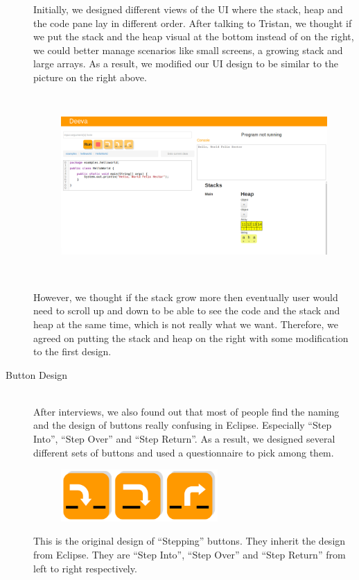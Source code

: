 \documentclass[11pt, a4paper]{article}
\begin{document}
\begin{description}
Initially, we designed different views of the UI where the stack, heap and the code pane lay in different order.
After talking to Tristan, we thought if we put the stack and the heap visual at the bottom instead of on the right, we could better manage scenarios like small screens, a growing stack and large arrays.
As a result, we modified our UI design to be similar to the picture on the right above.\\
\begin{figure}[h!]
\centering
\includegraphics[height=70mm,width=130mm]{finalDesign.png}
\end{figure}

However, we thought if the stack grow more then eventually user would need to scroll up and down to be able to see the code and the stack and heap at the same time, which is not really what we want.
Therefore, we agreed on putting the stack and heap on the right with some modification to the first design.

\item[Button Design] \hfill \\
After interviews, we also found out that most of people find the naming and the design of buttons really confusing in Eclipse.
Especially “Step Into”, “Step Over” and “Step Return”. As a result, we designed several different sets of buttons and used a questionnaire to pick among them.
\begin{figure}[h!]
\centering
\includegraphics[height=20mm,width=60mm]{buttons1.png}
\end{figure}

This is the original design of “Stepping” buttons.
They inherit the design from Eclipse.
They are “Step Into”, “Step Over” and “Step Return” from left to right respectively. 


\end{description}
\end{document}

